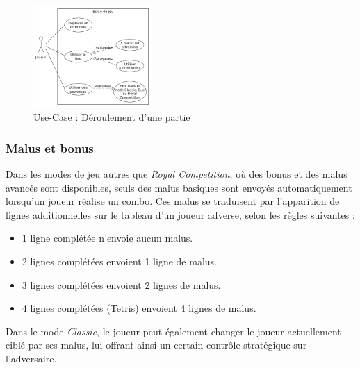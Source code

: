 \documentclass{report}
\begin{document}
\begin{figure}[H]
    \centering
     \includegraphics[width=0.4\textwidth, keepaspectratio]{src/user_req/jeu.png}
    \caption{Use-Case : Déroulement d'une partie}
    \label{fig:use_case_game}
\end{figure}

\subsubsection{Malus et bonus}

\noindent Dans les modes de jeu autres que \emph{Royal Competition}, où des bonus et des malus avancés sont disponibles, seuls des malus basiques sont envoyés automatiquement lorsqu'un joueur réalise un combo. Ces malus se traduisent par l'apparition de lignes additionnelles sur le tableau d'un joueur adverse, selon les règles suivantes :
\begin{itemize}
    \item 1 ligne complétée n'envoie aucun malus.
    \item 2 lignes complétées envoient 1 ligne de malus.
    \item 3 lignes complétées envoient 2 lignes de malus.
    \item 4 lignes complétées (Tetris) envoient 4 lignes de malus. \\
\end{itemize}

\vspace{-1em}

\noindent Dans le mode \emph{Classic}, le joueur peut également changer le joueur actuellement ciblé par ses malus, lui offrant ainsi un certain contrôle stratégique sur l’adversaire. \\

\vspace{-1em}
\end{document}
